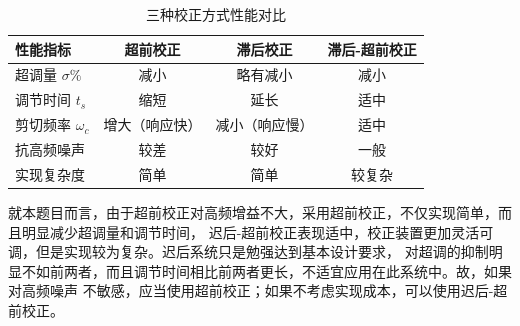 \documentclass[../report.tex]{subfiles}
\begin{document}
\begin{table}[htbp]
    \centering
    \caption{三种校正方式性能对比}
    \label{tab:correction_comparison}
    \begin{tabular}{lccc}
        \toprule
        \textbf{性能指标} & \textbf{超前校正} & \textbf{滞后校正} & \textbf{滞后-超前校正} \\
        \midrule
        超调量 $\sigma\%$ & 减小 & 略有减小 & 减小 \\
        调节时间 $t_s$ & 缩短 & 延长 & 适中 \\
        剪切频率 $\omega_c$ & 增大（响应快） & 减小（响应慢） & 适中 \\
        抗高频噪声 & 较差 & 较好 & 一般 \\
        实现复杂度 & 简单 & 简单 & 较复杂 \\
        \bottomrule
    \end{tabular}
\end{table}

就本题目而言，由于超前校正对高频增益不大，采用超前校正，不仅实现简单，而且明显减少超调量和调节时间，
迟后-超前校正表现适中，校正装置更加灵活可调，但是实现较为复杂。迟后系统只是勉强达到基本设计要求，
对超调的抑制明显不如前两者，而且调节时间相比前两者更长，不适宜应用在此系统中。故，如果对高频噪声
不敏感，应当使用超前校正；如果不考虑实现成本，可以使用迟后-超前校正。



\end{document}
